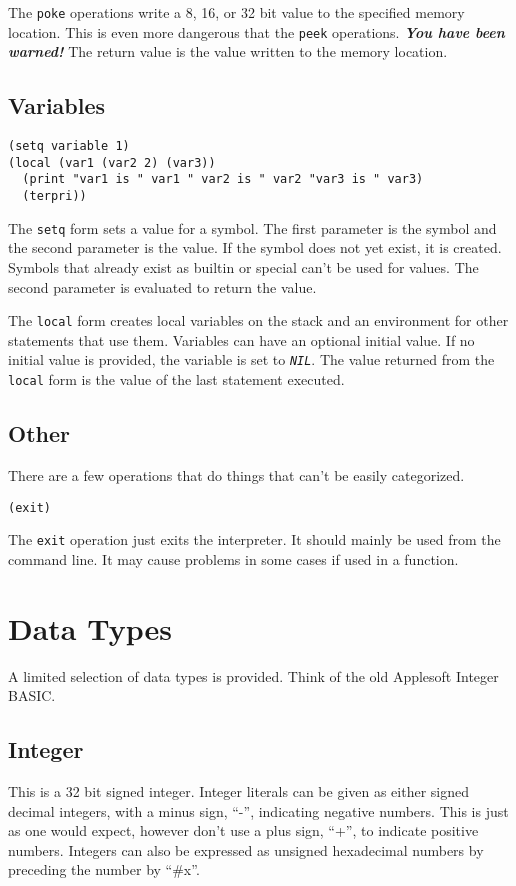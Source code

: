 \documentclass[10pt, openany]{book}
\newcommand{\function}[1]{\texttt{#1}}
\newcommand{\constant}[1]{\emph{\texttt{#1}}}
\begin{document}
The \function{poke} operations write a 8, 16, or 32 bit value to the specified memory location.  This is even more dangerous that the \function{peek} operations.  \textbf{\textit{You have been warned!}}  The return value is the value written to the memory location.

\subsection{Variables}

\begin{lstlisting}
(setq variable 1)
(local (var1 (var2 2) (var3))
  (print "var1 is " var1 " var2 is " var2 "var3 is " var3)
  (terpri))
\end{lstlisting}

The \function{setq} form sets a value for a symbol.  The first parameter is the symbol and the second parameter is the value.  If the symbol does not yet exist, it is created.  Symbols that already exist as builtin or special can't be used for values.  The second parameter is evaluated to return the value.

The \function{local} form creates local variables on the stack and an environment for other statements that use them.  Variables can have an optional initial value.  If no initial value is provided, the variable is set to \constant{NIL}.  The value returned from the \function{local} form is the value of the last statement executed.

\subsection{Other}
There are a few operations that do things that can't be easily categorized.

\begin{lstlisting}
(exit)
\end{lstlisting}

The \function{exit} operation just exits the interpreter.  It should mainly be used from the command line.  It may cause problems in some cases if used in a function.

\section{Data Types}
A limited selection of data types is provided.  Think of the old Applesoft Integer BASIC.

\subsection{Integer}
This is a 32 bit signed integer.  Integer literals can be given as either signed decimal integers, with a minus sign, ``-'', indicating negative numbers.  This is just as one would expect, however don't use a plus sign, ``+'', to indicate positive numbers.  Integers can also be expressed as unsigned hexadecimal numbers by preceding the number by ``\#x''.
\end{document}
